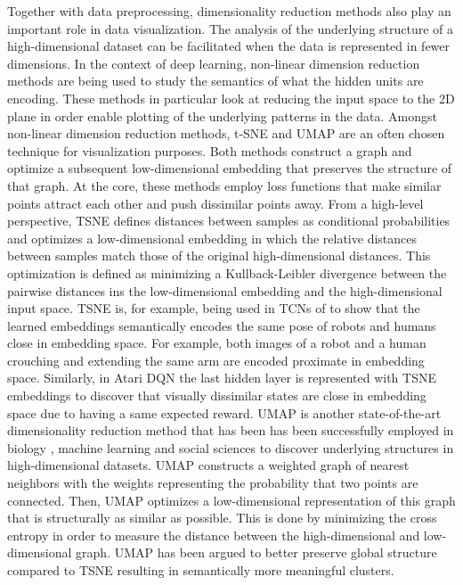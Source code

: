 \documentclass[\home/main.tex]{subfiles}
\begin{document}
Together with data preprocessing, dimensionality reduction methods also play an important role in data visualization. The analysis of the underlying structure of a high-dimensional dataset can be facilitated when the data is represented in fewer dimensions. In the context of deep learning, non-linear dimension reduction methods are being used to study the semantics of what the hidden units are encoding. These methods in particular look at reducing the input space to the $2$D plane in order enable plotting of the underlying patterns in the data. Amongst non-linear dimension reduction methods, t-SNE and UMAP are an often chosen technique for visualization purposes. Both methods construct a graph and optimize a subsequent low-dimensional embedding that preserves the structure of that graph. At the core, these methods employ loss functions that make similar points attract each other and push dissimilar points away. From a high-level perspective, \gls{TSNE} defines distances between samples as conditional probabilities and optimizes a low-dimensional embedding in which the relative distances between samples match those of the original high-dimensional distances. This optimization is defined as minimizing a Kullback-Leibler divergence between the pairwise distances ins the low-dimensional embedding and the high-dimensional input space. \gls{TSNE} is, for example, being used in \glspl{TCN} of \textcite{Sermanet2017TCN} to show that the learned embeddings semantically encodes the same pose of robots and humans close in embedding space. For example, both images of a robot and a human crouching and extending the same arm are encoded proximate in embedding space. Similarly, in Atari DQN \autocite{mnih2015human} the last hidden layer is represented with \gls{TSNE} embeddings to discover that visually dissimilar states are close in embedding space due to having a same expected reward. 
\Gls{UMAP} is another state-of-the-art dimensionality reduction method that has been has been successfully employed in biology \autocite{cao2019single}, machine learning \autocite{carter2019activation} and social sciences \autocite{diaz2019umap} to discover underlying structures in high-dimensional datasets. \Gls{UMAP} constructs a weighted graph of nearest neighbors with the weights representing the probability that two points are connected. Then, UMAP optimizes a low-dimensional representation of this graph that is structurally as similar as possible. This is done by minimizing the cross entropy in order to measure the distance between the high-dimensional and low-dimensional graph. \gls{UMAP} has been argued to better preserve global structure compared to \gls{TSNE} \autocite{becht2019dimensionality} resulting in semantically more meaningful clusters. 
\end{document}
